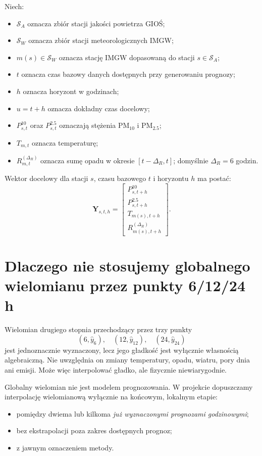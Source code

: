 \documentclass[11pt,a4paper,oneside]{article}
\newcommand{\PMten}{\mathrm{PM}_{10}}
\newcommand{\PMtwo}{\mathrm{PM}_{2.5}}
\newcommand{\Y}{\mathbf{Y}}
\begin{document}
Niech:
\begin{itemize}[nosep]
  \item $\mathcal{S}_A$ oznacza zbiór stacji jakości powietrza GIOŚ;
  \item $\mathcal{S}_W$ oznacza zbiór stacji meteorologicznych IMGW;
  \item $m(s)\in\mathcal{S}_W$ oznacza stację IMGW dopasowaną do stacji
        $s\in\mathcal{S}_A$;
  \item $t$ oznacza czas bazowy danych dostępnych przy generowaniu prognozy;
  \item $h$ oznacza horyzont w godzinach;
  \item $u=t+h$ oznacza dokładny czas docelowy;
  \item $P^{10}_{s,t}$ oraz $P^{2.5}_{s,t}$ oznaczają stężenia
        $\PMten$ i $\PMtwo$;
  \item $T_{m,t}$ oznacza temperaturę;
  \item $R^{(\Delta_R)}_{m,t}$ oznacza sumę opadu w okresie
        $[t-\Delta_R,t]$; domyślnie $\Delta_R=6$ godzin.
\end{itemize}

Wektor docelowy dla stacji $s$, czasu bazowego $t$ i horyzontu $h$ ma postać:
\begin{equation}
  \Y_{s,t,h} =
  \begin{bmatrix}
    P^{10}_{s,t+h}\\
    P^{2.5}_{s,t+h}\\
    T_{m(s),t+h}\\
    R^{(\Delta_R)}_{m(s),t+h}
  \end{bmatrix}.
  \label{eq:target-vector}
\end{equation}

\section{Dlaczego nie stosujemy globalnego wielomianu przez punkty 6/12/24 h}

Wielomian drugiego stopnia przechodzący przez trzy punkty
\[
  (6,\widehat y_6),\quad (12,\widehat y_{12}),\quad (24,\widehat y_{24})
\]
jest jednoznacznie wyznaczony, lecz jego gładkość jest wyłącznie własnością
algebraiczną. Nie uwzględnia on zmiany temperatury, opadu, wiatru, pory dnia
ani emisji. Może więc interpolować gładko, ale fizycznie niewiarygodnie.

Globalny wielomian nie jest modelem prognozowania. W projekcie dopuszczamy
interpolację wielomianową wyłącznie na końcowym, lokalnym etapie:
\begin{itemize}[nosep]
  \item pomiędzy dwiema lub kilkoma \emph{już wyznaczonymi prognozami
        godzinowymi};
  \item bez ekstrapolacji poza zakres dostępnych prognoz;
  \item z jawnym oznaczeniem metody.
\end{itemize}
\end{document}
